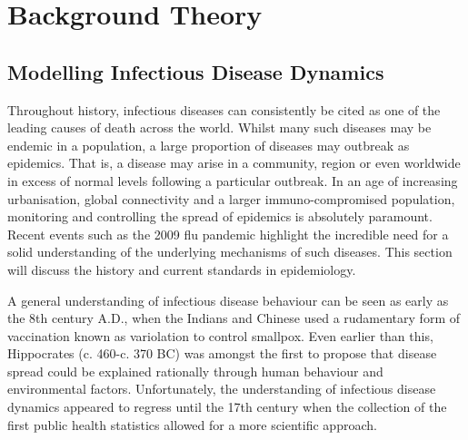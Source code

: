 \chapter{Background Theory}

\label{ch:background}

\section{Modelling Infectious Disease Dynamics}
Throughout history, infectious diseases can consistently be cited as one of the leading causes of death across the world. Whilst many such diseases may be endemic in a population,  a large proportion  of diseases may outbreak as epidemics. That is, a disease may arise in a community, region or even worldwide in excess of normal levels following a particular outbreak. In an age of increasing urbanisation, global connectivity and a larger immuno-compromised population, monitoring and controlling the spread of epidemics is absolutely paramount.\cite{computational} Recent events such as the 2009 flu pandemic highlight the incredible need for a solid understanding of the underlying mechanisms of such diseases. This section will discuss the history and current standards in epidemiology.

A general understanding of infectious disease behaviour can be seen as early as the 8th century A.D., when the Indians and Chinese used a rudamentary form of vaccination known as variolation to control smallpox.\cite{variolation} Even earlier than this, Hippocrates (c. 460-c. 370 BC) was amongst the first to propose that disease spread could be explained rationally through human behaviour and environmental factors.\cite{hippo} Unfortunately, the understanding of infectious disease dynamics appeared to regress until the 17th century when the collection of the first public health statistics allowed for a more scientific approach. 

